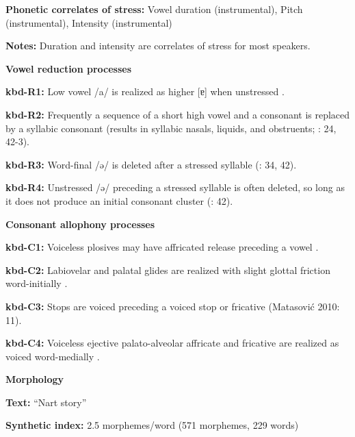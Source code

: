\textbf{Phonetic correlates of stress:} Vowel duration (instrumental), Pitch (instrumental), Intensity (instrumental)



\textbf{Notes:} Duration and intensity are correlates of stress for most speakers.



\textbf{Vowel reduction processes}



\textbf{kbd-R1:} Low vowel /a/ is realized as higher [ɐ] when unstressed \citep[98-9]{Applebaum2013}.



\textbf{kbd-R2:} Frequently a sequence of a short high vowel and a consonant is replaced by a syllabic consonant (results in syllabic nasals, liquids, and obstruents; \citealt{Kuipers1960}: 24, 42-3).



\textbf{kbd-R3:} Word-final /ə/ is deleted after a stressed syllable (\citealt{Kuipers1960}: 34, 42).



\textbf{kbd-R4:} Unstressed /ə/ preceding a stressed syllable is often deleted, so long as it does not produce an initial consonant cluster (\citealt{GordonApplebaum2010}: 42).



\textbf{Consonant allophony processes}



\textbf{kbd-C1:} Voiceless plosives may have affricated release preceding a vowel \citep[17]{Kuipers1960}.



\textbf{kbd-C2:} Labiovelar and palatal glides are realized with slight glottal friction word-initially \citep[22]{Kuipers1960}.



\textbf{kbd-C3:} Stops are voiced preceding a voiced stop or fricative (Matasović 2010: 11).



\textbf{kbd-C4:} Voiceless ejective palato-alveolar affricate and fricative are realized as voiced word-medially \citep[19]{Kuipers1960}.



\textbf{Morphology}



\textbf{Text:} “Nart story” \citep[223-231]{Applebaum2013}



\textbf{Synthetic index:} 2.5 morphemes/word (571 morphemes, 229 words)



